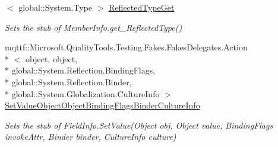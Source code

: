 \begin{DoxyCompactItemize}
$<$ global\-::\-System.\-Type $>$ \hyperlink{class_system_1_1_reflection_1_1_fakes_1_1_stub_field_info_a5a94d8e16d2f1b5ca4df41e8aec63f27}{Reflected\-Type\-Get}
\begin{DoxyCompactList}\small\item\em Sets the stub of Member\-Info.\-get\-\_\-\-Reflected\-Type()\end{DoxyCompactList}\item 
mqttf\-::\-Microsoft.\-Quality\-Tools.\-Testing.\-Fakes.\-Fakes\-Delegates.\-Action\\*
$<$ object, object, \\*
global\-::\-System.\-Reflection.\-Binding\-Flags, \\*
global\-::\-System.\-Reflection.\-Binder, \\*
global\-::\-System.\-Globalization.\-Culture\-Info $>$ \hyperlink{class_system_1_1_reflection_1_1_fakes_1_1_stub_field_info_afac138fc56cd081d2e96679ef295764a}{Set\-Value\-Object\-Object\-Binding\-Flags\-Binder\-Culture\-Info}
\begin{DoxyCompactList}\small\item\em Sets the stub of Field\-Info.\-Set\-Value(\-Object obj, Object value, Binding\-Flags invoke\-Attr, Binder binder, Culture\-Info culture)\end{DoxyCompactList}\end{DoxyCompactItemize}
